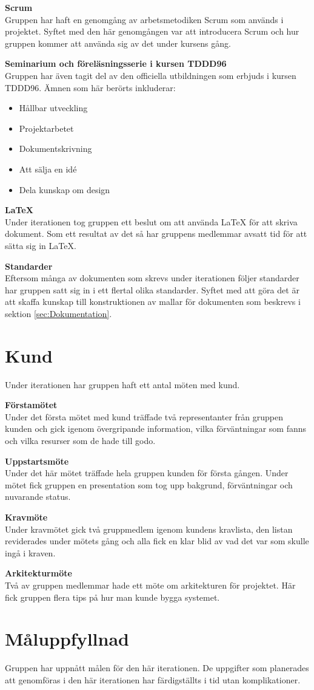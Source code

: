 \documentclass[a4paper,10pt]{article}
\begin{document}
\textbf{Scrum}\\ Gruppen har haft en genomgång av arbetsmetodiken Scrum som används i projektet. Syftet med den här genomgången var att introducera Scrum och hur gruppen kommer att använda sig av det under kursens gång.

\textbf{Seminarium och föreläsningsserie i kursen TDDD96}\\ Gruppen har även tagit del av den officiella utbildningen som erbjuds i kursen TDDD96. Ämnen som här berörts inkluderar:
\begin{itemize}
    \item Hållbar utveckling
    \item Projektarbetet
    \item Dokumentskrivning
    \item Att sälja en idé
    \item Dela kunskap om design
\end{itemize}

\textbf{\LaTeX}\\ Under iterationen tog gruppen ett beslut om att använda LaTeX för att skriva dokument. Som ett resultat av det så har gruppens medlemmar avsatt tid för att sätta sig in LaTeX.

\textbf{Standarder}\\ Eftersom många av dokumenten som skrevs under iterationen följer standarder har gruppen satt sig in i ett flertal olika standarder. Syftet med att göra det är att skaffa kunskap till konstruktionen av mallar för dokumenten som beskrevs i sektion \ref{sec:Dokumentation}.

\section{Kund}
Under iterationen har gruppen haft ett antal möten med kund.

\textbf{Förstamötet}\\
Under det första mötet med kund träffade två representanter från gruppen kunden och gick igenom övergripande information, vilka förväntningar som fanns och vilka resurser som de hade till godo.

\textbf{Uppstartsmöte}\\
Under det här mötet träffade hela gruppen kunden för första gången. Under mötet fick gruppen en presentation som tog upp bakgrund, förväntningar och nuvarande status.

\textbf{Kravmöte}\\
Under kravmötet gick två gruppmedlem igenom kundens kravlista, den listan reviderades under mötets gång och alla fick en klar blid av vad det var som skulle ingå i kraven.

\textbf{Arkitekturmöte}\\
Två av gruppen medlemmar hade ett möte om arkitekturen för projektet. Här fick gruppen flera tips på hur man kunde bygga systemet.

\section{Måluppfyllnad}
Gruppen har uppnått målen för den här iterationen. De uppgifter som planerades att genomföras i den här iterationen har färdigställts i tid utan komplikationer.
\end{document}
